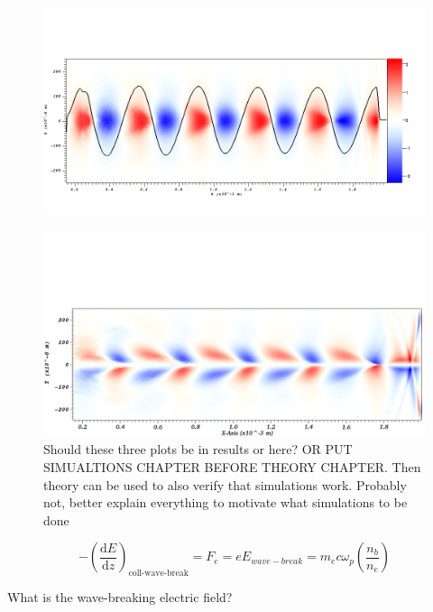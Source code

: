 \begin{figure}
\centering
\includegraphics[width=\textwidth]{Ex_nonlinear.png}
\end{figure}
\begin{figure}
\centering
\includegraphics[width=\textwidth]{Ey_nonlinear.png}
\caption{Should these three plots be in results or here? OR PUT SIMUALTIONS CHAPTER BEFORE THEORY CHAPTER. Then theory can be used to also verify that simulations work. Probably not, better explain everything to motivate what simulations to be done }
\end{figure}
\begin{equation}
-\left(\frac{\mathrm{d}E}{\mathrm{d}z}\right)_{\text{coll-wave-break}}=F_e=eE_{wave-break}=m_e c\omega_{p}\left(\frac{n_b}{n_e}\right)
\end{equation}

What is the wave-breaking electric field?

